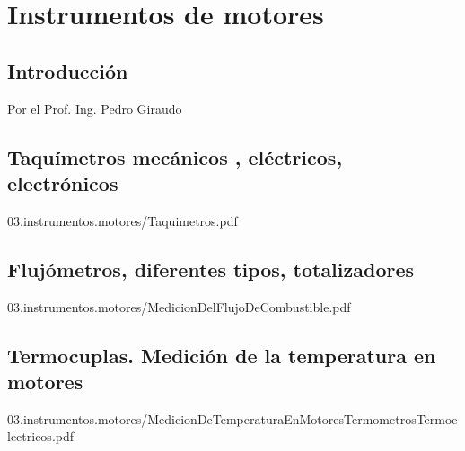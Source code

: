%


\chapter{Instrumentos de motores}
\label{chap:U03.instrumentos.de.motores}




\section{Introducci\'on}
\label{sec:U03.00.introduccion}

\begin{flushright}
  Por el Prof. Ing. Pedro Giraudo
\end{flushright}

\section{Taquímetros mecánicos , eléctricos, electrónicos}
\label{sec:U03.01.taquimetros}

  
{03.instrumentos.motores/Taquimetros.pdf}

\section{Flujómetros, diferentes tipos, totalizadores}
\label{sec:U03.02.flujometros}

  
{03.instrumentos.motores/MedicionDelFlujoDeCombustible.pdf}


\section{Termocuplas. Medición de la temperatura en motores}
\label{sec:U03.termocuplas}


  
{03.instrumentos.motores/MedicionDeTemperaturaEnMotoresTermometrosTermoelectricos.pdf}